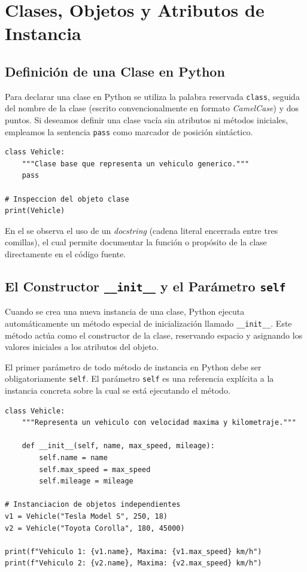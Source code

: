 \chapter{Clases, Objetos y Atributos de Instancia}

\section{Definición de una Clase en Python}
Para declarar una clase en Python se utiliza la palabra reservada \texttt{class}, seguida del nombre de la clase
(escrito convencionalmente en formato \textit{CamelCase}) y dos puntos.
Si deseamos definir una clase vacía sin atributos ni métodos iniciales, empleamos la sentencia \texttt{pass} como
marcador de posición sintáctico.

\begin{lstlisting}[caption={Definición de una clase vacía y su instanciación.}, label={list:clase_vacia}]
class Vehicle:
    """Clase base que representa un vehiculo generico."""
    pass

# Inspeccion del objeto clase
print(Vehicle)
\end{lstlisting}

En el  se observa el uso de un \textit{docstring} (cadena literal encerrada entre tres comillas),
el cual permite documentar la función o propósito de la clase directamente en el código fuente.

\section{El Constructor \texttt{\_\_init\_\_} y el Parámetro \texttt{self}}
Cuando se crea una nueva instancia de una clase, Python ejecuta automáticamente un método especial de inicialización
llamado \texttt{\_\_init\_\_}. Este método actúa como el constructor de la clase, reservando espacio y asignando los
valores iniciales a los atributos del objeto.

El primer parámetro de todo método de instancia en Python debe ser obligatoriamente \texttt{self}. El parámetro
\texttt{self} es una referencia explícita a la instancia concreta sobre la cual se está ejecutando el método.

\begin{lstlisting}[caption={Uso del constructor y asignación de atributos de instancia.}, label={list:init_atributos}]
class Vehicle:
    """Representa un vehiculo con velocidad maxima y kilometraje."""
    
    def __init__(self, name, max_speed, mileage):
        self.name = name
        self.max_speed = max_speed
        self.mileage = mileage

# Instanciacion de objetos independientes
v1 = Vehicle("Tesla Model S", 250, 18)
v2 = Vehicle("Toyota Corolla", 180, 45000)

print(f"Vehiculo 1: {v1.name}, Maxima: {v1.max_speed} km/h")
print(f"Vehiculo 2: {v2.name}, Maxima: {v2.max_speed} km/h")
\end{lstlisting}

